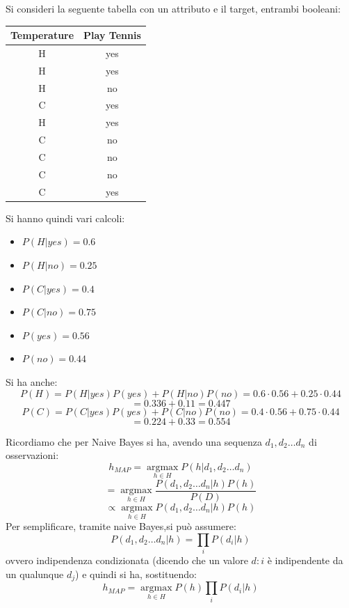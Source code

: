 \documentclass[a4paper,12pt, oneside]{book}
\begin{document}
\begin{esercizio}
  Si consideri la seguente tabella con un attributo e il target, entrambi
  booleani:
  \begin{table}[H]
    \centering
    \begin{tabular}{c||c}
      Temperature & Play Tennis\\
      \hline
      \hline
      H & yes\\
      H & yes\\
      H & no\\
      C & yes\\
      H & yes\\
      C & no\\
      C & no\\
      C & no\\
      C & yes\\
    \end{tabular}
  \end{table}
  Si hanno quindi vari calcoli:
  \begin{itemize}
    \item $P(H|yes)=0.6$
    \item $P(H|no)=0.25$
    \item $P(C|yes)=0.4$
    \item $P(C|no)=0.75$
    \item $P(yes)=0.56$
    \item $P(no)=0.44$
  \end{itemize}
  Si ha anche:
  \[P(H)=P(H|yes)P(yes)+P(H|no)P(no)=0.6\cdot 0.56+0.25\cdot 0.44 \]
  \[= 0.336+0.11=0.447\]
  \[P(C)=P(C|yes)P(yes)+P(C|no)P(no)=0.4\cdot 0.56+0.75\cdot 0.44 \]
  \[= 0.224+0.33=0.554\]
\end{esercizio}
Ricordiamo che per Naive Bayes si ha, avendo una sequenza $d_1,d_2\ldots d_n$ di
osservazioni: 
\[h_{MAP}=\operatorname*{argmax}_{h\in H}P(h|d_1,d_2\ldots d_n)\]
\[=\operatorname*{argmax}_{h\in H}\frac{P(d_1,d_2\ldots d_n|h)P(h)}{P(D)}\]
\[\varpropto\operatorname*{argmax}_{h\in H}P(d_1,d_2\ldots d_n|h)P(h)\]
Per semplificare, tramite naive Bayes,si può assumere:
\[P(d_1,d_2\ldots d_n|h)=\prod_iP(d_i|h)\]
ovvero indipendenza condizionata (dicendo che un valore $d:i$ è indipendente da
un qualunque $d_j$) e quindi si ha, sostituendo:
\[h_{MAP}=\operatorname*{argmax}_{h\in H}P(h)\prod_iP(d_i|h)\]
\newpage
\end{document}
